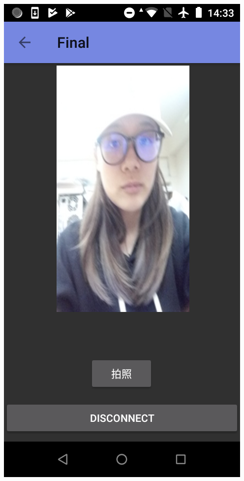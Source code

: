 \documentclass[12pt]{article}  %
\theoremstyle{plain}
\begin{document}
\begin{itemize}
\includegraphics[scale=0.2]{pic/ch4/game04.png}
\space \space

\end{itemize}
\end{document}
